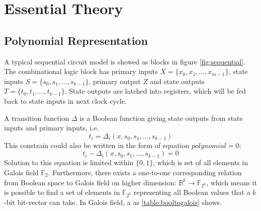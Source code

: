 
\section{Essential Theory}
\subsection{Polynomial Representation}
A typical sequential circuit model is showed as blocks in figure \ref{fig:sequential}. The combinational logic block 
has primary inputs $X = \{x_0, x_1, \dots, x_{m-1}\}$, state
inputs $S = \{s_0, s_1, \dots, s_{k-1}\}$, primary output $Z$ and state outputs $T = \{t_0, t_1, \dots, t_{k-1}\}$. State outputs
are latched into registers, which will be fed back to state inputs in next clock cycle.



A transition function $\Delta$ is a Boolean function giving state outputs from state inputs and primary inputs, i.e.
\begin{displaymath}
t_i = \Delta_i(x, s_0, s_1, \dots, s_{k-1})
\end{displaymath}
This constrain could also be written in the form of equation $polynomial = 0$:
\begin{displaymath}
t_i - \Delta_i(x, s_0, s_1, \dots, s_{k-1}) = 0
\end{displaymath}
Solution to this equation is limited within $\{0, 1\}$, which is set of all elements in Galois field $\mathbb{F}_2$.
Furthermore, there exists a one-to-one corresponding relation from Boolean space to Galois field on higher dimension: 
$\mathbb{B}^k \to \mathbb{F}_{2^k}$, which means it is possible to find a set of elements in $\mathbb{F}_{2^k}$ representing
all Boolean values that a $k$-bit bit-vector can take. In Galois
field, a as \ref{table:booltogalois} shows. 

